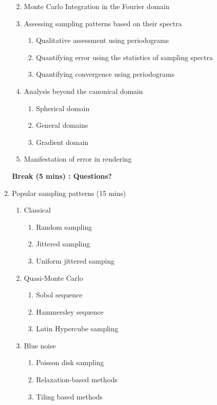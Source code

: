 \begin{enumerate}
\begin{enumerate}
\begin{enumerate}
		\end{enumerate}
		\item Monte Carlo Integration in the Fourier domain
		\item Assessing sampling patterns based on their spectra
		\begin{enumerate}
		\itemsep-0.6em
			\item Qualitative assessment using periodograms
			\item Quantifying error using the statistics of sampling spectra
			\item Quantifying convergence using periodograms
		\end{enumerate}
		\item Analysis beyond the canonical domain
		\begin{enumerate} 
		\itemsep-0.6em
			\item Spherical domain
			\item General domains
			\item Gradient domain
		\end{enumerate}
		\item Manifestation of error in rendering
	\end{enumerate}
	\textbf{Break (5 mins) : Questions?} 
	\item Popular sampling patterns (15 mins)
	\begin{enumerate}
	\itemsep-0.4em
		\item Classical
		\begin{enumerate}
		\itemsep-0.6em
			\item Random sampling
			\item Jittered sampling
			\item Uniform jittered samping
		\end{enumerate}
		\item Quasi-Monte Carlo
		\begin{enumerate}
		\itemsep-0.6em
			\item Sobol sequence
			\item Hammersley sequence
			\item Latin Hypercube sampling
		\end{enumerate}
		\item Blue noise
		\begin{enumerate}
		\itemsep-0.6em
			\item Poisson disk sampling
			\item Relaxation-based methods
			\item Tiling based methods
		\end{enumerate}

\end{enumerate}
\end{enumerate}
